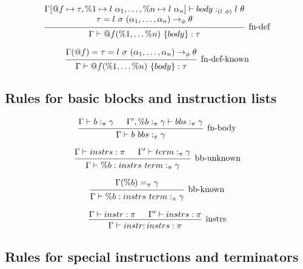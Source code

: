 \documentclass{article}
\begin{document}
\[
\begin{prooftree}
    \hypo{
    \begin{matrix}
        \Gamma[@f \mapsto \tau, \%1 \mapsto l\ \alpha_1, \ldots, \%n \mapsto l\ \alpha_n] \vdash body :_{(l\ \phi)} l\ \theta \\
        \tau = l\ \sigma\ (\alpha_1, \dots, \alpha_n) \rightarrow_\phi \theta
    \end{matrix}
    }
    \infer1[fn-def]{\Gamma \vdash @f(\%1, \dots \%n)\ \{ body \} : \tau}
    
\end{prooftree}
\]

\[
\begin{prooftree}
    \hypo{
    \Gamma(@f) = \tau = l\ \sigma\ (\alpha_1, \dots, \alpha_n) \rightarrow_\phi \theta
    }
    \infer1[fn-def-known]{\Gamma \vdash @f(\%1, \dots \%n)\ \{ body \} : \tau}
\end{prooftree}
\]

\subsection{Rules for basic blocks and instruction lists}

\[
\begin{prooftree} 
    \hypo{\Gamma \vdash b :_\pi \gamma}
    \hypo{\Gamma', \%b :_\pi \gamma \vdash bbs :_\pi \gamma}
    \infer2[fn-body]{\Gamma \vdash b\ bbs :_\pi \gamma}
\end{prooftree} 
\]


\[
\begin{prooftree} 
    \hypo{\Gamma \vdash instrs : \pi}
    \hypo{\Gamma' \vdash term :_\pi \gamma}
    \infer2[bb-unknown]{\Gamma \vdash \%b: instrs\ term :_\pi \gamma}
\end{prooftree} 
\]


\[
\begin{prooftree} 
    \hypo{\Gamma(\%b) =_\pi \gamma} 
    \infer1[bb-known]{\Gamma \vdash \%b: instrs\ term :_\pi \gamma}
\end{prooftree} 
\]


\[
\begin{prooftree} 
    \hypo{\Gamma \vdash instr : \pi}
    \hypo{\Gamma' \vdash instrs : \pi}
    \infer2[instrs]{\Gamma \vdash instr; instrs : \pi}
\end{prooftree} 
\]

\subsection{Rules for special instructions and terminators}
\end{document}
